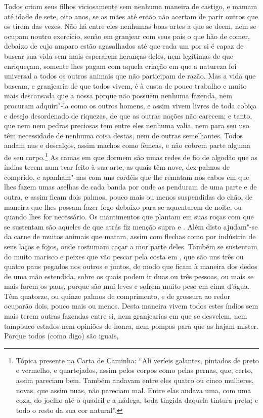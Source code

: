  Todos criam seus filhos viciosamente sem nenhuma maneira de castigo, e			%
mamam até idade de sete, oito anos, se as mães até então não acertam de
parir outros que os tirem das vezes. Não há entre eles nenhumas boas
artes a que se deem, nem se ocupam noutro exercício, senão em granjear
com seus pais o que hão de comer, debaixo de cujo amparo estão
agasalhados até que cada um por si é capaz de buscar sua vida sem mais
esperarem heranças deles, nem legítimas de que enriqueçam, somente lhes
pagam com aquela criação em que a natureza foi universal a todos os
outros animais que não participam de razão. Mas a vida que buscam, e
granjearia de que todos vivem, é à custa de pouco trabalho e muito mais descansada que a nossa porque não possuem nenhuma fazenda, nem procuram adquiri"-la como os outros homens, e assim vivem livres de toda cobiça e desejo
desordenado de riquezas, de que as outras nações não carecem; e tanto,
que  nem  nem pedras preciosas tem entre eles nenhuma valia,		%
nem para seu uso têm necessidade de nenhuma coisa destas, nem de outras
semelhantes. Todos andam nus e descalços, assim machos como fêmeas, e
não cobrem parte alguma de seu corpo.\footnote{ Tópica presente 
na Carta de Caminha: ``Ali veríeis galantes, pintados de
preto e vermelho, e quartejados, assim pelos corpos como pelas pernas, que,
certo, assim pareciam bem. Também andavam entre eles quatro ou cinco mulheres,
novas, que assim nuas, não pareciam mal. Entre elas andava uma, com uma coxa, do
joelho até o quadril e a nádega, toda tingida daquela tintura preta; e todo o
resto da sua cor natural''.} 
As camas em que dormem são umas
redes de fio de algodão que as índias tecem num tear feito à sua arte, as		%
quais têm nove, dez palmos de comprido, e apanham"-nas com uns cordéis
que lhe rematam nos cabos em que lhes fazem umas aselhas
de cada banda por onde as penduram de uma parte e de outra, e assim
ficam dois palmos, pouco mais ou menos suspendidas do chão, de maneira
que lhes possam fazer fogo debaixo para se aquentarem de noite, ou
quando lhes for necessário. Os mantimentos que plantam em suas roças			%
com que se sustentam são aqueles de que atrás fiz menção supra
 e . Além disto ajudam"-se da carne de muitos	%
animais que matam, assim com flechas como por indústria de seus laços e
fojos, onde costumam caçar a mor parte deles. Também se sustentam do
muito marisco e peixes que vão pescar pela costa em , que são		%
uns três ou quatro paus pegados nos outros e juntos, de modo que ficam
à maneira dos dedos de uma mão estendida, sobre os quais podem ir duas
ou três pessoas, ou mais se mais forem os paus, porque são mui leves e
sofrem muito peso em cima d'água. Têm quatorze, ou
quinze palmos de comprimento, e de grossura ao redor ocuparão dois, pouco
mais ou menos. Desta maneira vivem todos estes índios sem mais terem			%
outras fazendas entre si, nem granjearias em que se desvelem, nem tampouco
estados nem opiniões de honra, nem pompas para que as hajam
mister. Porque todos (como digo) são iguais, \linebreak  

